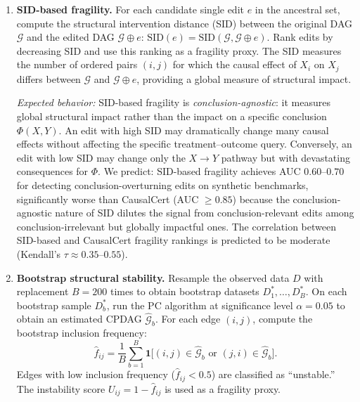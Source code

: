 \documentclass[11pt,a4paper]{article}
\theoremstyle{definition}
\theoremstyle{remark}
\newcommand{\DAG}{\mathcal{G}}
\newcommand{\Phi}{\varPhi}
\begin{document}
\begin{enumerate}[label=\textbf{B\arabic*:},start=7]
  \emph{Expected behavior:} IDA captures within-MEC variation only and
  does not search beyond the equivalence class. CausalCert's $k$-edit
  neighborhoods span multiple MECs for $k \geq 2$
  (), providing a strictly more general search space.
  We predict: IDA range width correlates moderately with CausalCert
  fragility (Spearman $\rho \approx 0.3$--$0.5$) because within-MEC
  variation is a subset of structural variation. As a fragility
  classifier, IDA-based ranking achieves AUC $\approx 0.60$--$0.70$
  on synthetic benchmarks---better than random (B7) but substantially
  worse than CausalCert's AUC $\geq 0.85$ because IDA is blind to
  cross-MEC fragility.

\item \textbf{SID-based fragility.} For each candidate single edit
  $e$ in the ancestral set, compute the structural intervention distance
  (SID) \cite{peters2015} between the original DAG $\DAG$ and the
  edited DAG $\DAG \oplus e$:
  $\mathrm{SID}(e) = \mathrm{SID}(\DAG, \DAG \oplus e)$.
  Rank edits by decreasing SID and use this ranking as a fragility
  proxy. The SID measures the number of ordered pairs $(i,j)$ for which
  the causal effect of $X_i$ on $X_j$ differs between $\DAG$ and
  $\DAG \oplus e$, providing a global measure of structural impact.

  \emph{Expected behavior:} SID-based fragility is \emph{conclusion-agnostic}:
  it measures global structural impact rather than the impact on a specific
  conclusion $\Phi(X, Y)$. An edit with high SID may dramatically change
  many causal effects without affecting the specific treatment--outcome
  query. Conversely, an edit with low SID may change only the $X \to Y$
  pathway but with devastating consequences for $\Phi$. We predict:
  SID-based fragility achieves AUC $0.60$--$0.70$ for detecting
  conclusion-overturning edits on synthetic benchmarks, significantly
  worse than CausalCert (AUC $\geq 0.85$) because the conclusion-agnostic
  nature of SID dilutes the signal from conclusion-relevant edits among
  conclusion-irrelevant but globally impactful ones. The correlation
  between SID-based and CausalCert fragility rankings is predicted to be
  moderate (Kendall's $\tau \approx 0.35$--$0.55$).

\item \textbf{Bootstrap structural stability.} Resample the observed
  data $D$ with replacement $B = 200$ times to obtain bootstrap datasets
  $D_1^*, \ldots, D_B^*$. On each bootstrap sample $D_b^*$, run the PC
  algorithm \cite{spirtes2000} at significance level $\alpha = 0.05$ to
  obtain an estimated CPDAG $\hat{\DAG}_b$. For each edge $(i, j)$,
  compute the bootstrap inclusion frequency:
  \[
    \hat{f}_{ij} = \frac{1}{B} \sum_{b=1}^{B}
      \mathbf{1}\bigl[(i,j) \in \hat{\DAG}_b \text{ or }
      (j,i) \in \hat{\DAG}_b\bigr].
  \]
  Edges with low inclusion frequency ($\hat{f}_{ij} < 0.5$) are
  classified as ``unstable.'' The instability score
  $U_{ij} = 1 - \hat{f}_{ij}$ is used as a fragility proxy.


\end{enumerate}
\end{document}
